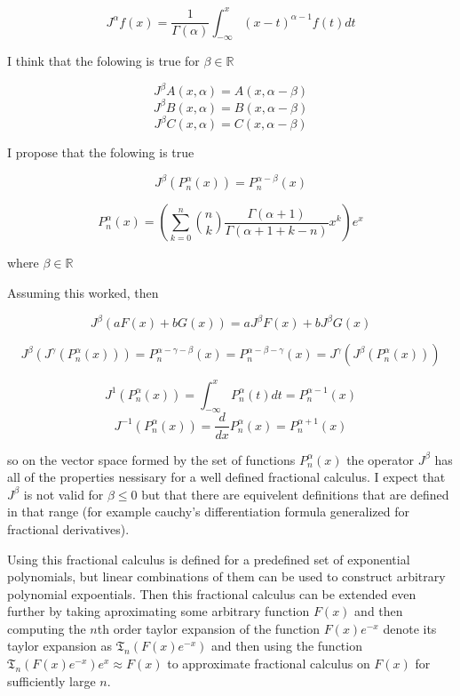 \documentclass[%
 preprint,
 amsmath, amssymb, aps, pra, 10pt
]{revtex4-2}
\begin{document}
\begin{equation}
J^\alpha f(x) = \frac{1}{\Gamma(\alpha)}\int_{-\infty}^x (x - t)^{\alpha - 1}f(t)dt
\label{operator_fractional_integral}
\end{equation}

I think that the folowing is true for $\beta \in \mathbb{R}$

\[J^\beta A(x, \alpha) = A(x, \alpha - \beta)\]
\[J^\beta B(x, \alpha) = B(x, \alpha - \beta)\]
\[J^\beta C(x, \alpha) = C(x, \alpha - \beta)\]

I propose that the folowing is true

\[J^\beta \left(P_n^\alpha(x)\right) = P_n^{\alpha-\beta}(x)\]

\[P_n^\alpha(x) = \left( \sum_{k=0}^n \binom{n}{k}\frac{\Gamma(\alpha + 1)}{\Gamma(\alpha + 1 + k - n)}x^k \right)e^x\]

where $\beta \in \mathbb{R}$

Assuming this worked, then

\[J^\beta \left(a F(x) + b G(x)\right) = a J^\beta F(x) + b J^\beta G(x)\]

\[J^\beta \left(J^\gamma \left( P_n^\alpha(x) \right)\right) = P_n^{\alpha - \gamma - \beta}(x)= P_n^{\alpha - \beta - \gamma}(x) = J^\gamma \left(J^\beta \left( P_n^\alpha(x) \right)\right)\]

\[J^{1} \left(P_n^\alpha(x)\right) = \int_{-\infty}^x P_n^\alpha(t)dt = P_n^{\alpha - 1}(x)\]
\[J^{-1} \left(P_n^\alpha(x)\right) = \frac{d}{dx} P_n^\alpha(x) = P_n^{\alpha + 1}(x)\]

so on the vector space formed by the set of functions $P_n^\alpha(x)$ the operator $J^\beta$ has all of the properties nessisary for a well defined fractional calculus. I expect that $J^\beta$ is not valid for $\beta \le 0$ but that there are equivelent definitions that are defined in that range (for example cauchy's differentiation formula generalized for fractional derivatives).

Using this fractional calculus is defined for a predefined set of exponential polynomials, but linear combinations of them can be used to construct arbitrary polynomial expoentials. Then this fractional calculus can be extended even further by taking aproximating some arbitrary function $F(x)$ and then computing the $n$th order taylor expansion of the function $F(x)e^{-x}$ denote its taylor expansion as $\mathfrak{T}_n\left(F(x)e^{-x}\right)$ and then using the function $\mathfrak{T}_n\left(F(x)e^{-x}\right)e^x \approx F(x)$ to approximate fractional calculus on $F(x)$ for sufficiently large $n$.
\end{document}
